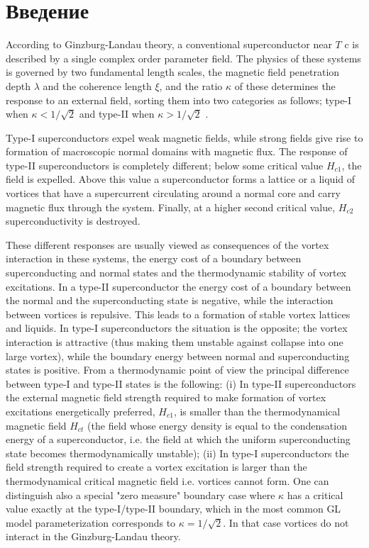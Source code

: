 \chapter{Введение}
\label{ch:1}

According to Ginzburg-Landau theory, a conventional superconductor near 
\( T \) c is described by a single complex order parameter field. The physics 
of these systems is governed by two fundamental length scales, the magnetic
field penetration depth \( \lambda \) and the coherence length \( \xi \), and
the ratio \( \kappa \) of these determines the response to an external
field, sorting them into two categories as follows; type-I when 
\( \kappa < 1/\sqrt{2} \) and type-II when \( \kappa > 1/\sqrt{2} \)
\cite{bib:3}.

Type-I superconductors expel weak magnetic fields, while strong fields give 
rise to formation of macroscopic normal domains with magnetic flux\cite{bib:4}. 
The response of type-II superconductors is completely different; below some 
critical value \( H_{c1} \), the field is expelled. Above this value a 
superconductor forms a lattice or a liquid of vortices that have a 
supercurrent circulating around a normal core and carry magnetic flux through 
the system. Finally, at a higher second critical value, \( H_{c2} \) 
superconductivity is destroyed. 

These different responses are usually viewed as consequences of the vortex 
interaction in these systems, the energy cost of a boundary between 
superconducting and normal states and the thermodynamic stability of vortex 
excitations. In a type-II superconductor the energy cost of a boundary between 
the normal and the superconducting state is negative, while the interaction 
between vortices is repulsive\cite{bib:3}. This leads to a formation of stable 
vortex lattices and liquids. In type-I superconductors the situation is the 
opposite; the vortex interaction is attractive (thus making them unstable 
against collapse into one large vortex), while the boundary energy between 
normal and superconducting states is positive. From a thermodynamic point of 
view the principal difference between type-I and type-II states is the 
following: (i) In type-II superconductors the external magnetic field strength 
required to make formation of vortex excitations energetically preferred, 
\( H_{c1} \), is smaller than the thermodynamical magnetic field \( H_{ct} \) 
(the field whose energy density is equal to the condensation energy of a 
superconductor, i.e. the field at which the uniform superconducting state 
becomes thermodynamically unstable); (ii) In type-I superconductors the field 
strength required to create a vortex excitation is larger than the 
thermodynamical critical magnetic field i.e. vortices cannot form. One can 
distinguish also a special "zero measure" boundary case where \( \kappa \) 
has a critical value exactly at the type-I/type-II boundary, which in the most 
common GL model parameterization corresponds to \( \kappa = 1/\sqrt{2} \). In 
that case vortices do not interact\cite{bib:5} in the Ginzburg-Landau theory. 

